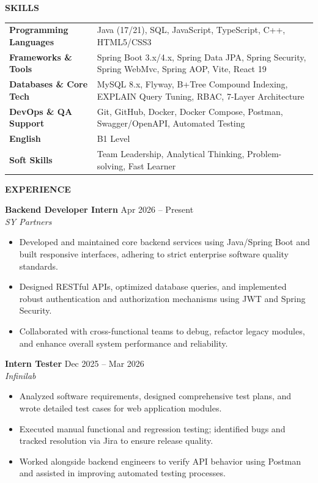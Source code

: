 ﻿\documentclass[11pt,a4paper]{article}
\newcommand{\cvsection}[1]{%
  \vspace{7pt}%
  \noindent\textbf{\large #1}\par%
  \vspace{3pt}%
}
\begin{document}
\cvsection{SKILLS}
\noindent
\begin{tabular*}{\textwidth}{@{}p{} p{}@{}}
\hline
\textbf{Programming Languages} & Java (17/21), SQL, JavaScript, TypeScript, C++, HTML5/CSS3 \\
\textbf{Frameworks \& Tools} & Spring Boot 3.x/4.x, Spring Data JPA, Spring Security, Spring WebMvc, Spring AOP, Vite, React 19 \\
\textbf{Databases \& Core Tech} & MySQL 8.x, Flyway, B+Tree Compound Indexing, EXPLAIN Query Tuning, RBAC, 7-Layer Architecture \\
\textbf{DevOps \& QA Support} & Git, GitHub, Docker, Docker Compose, Postman, Swagger/OpenAPI, Automated Testing \\
\textbf{English} & B1 Level \\
\textbf{Soft Skills} & Team Leadership, Analytical Thinking, Problem-solving, Fast Learner \\
\end{tabular*}

\cvsection{EXPERIENCE}

\noindent
\textbf{Backend Developer Intern} \hfill Apr 2026 -- Present \\
\textit{SY Partners}
\begin{itemize}[leftmargin=1.5em, itemsep=2pt, topsep=2pt]
    \item Developed and maintained core backend services using Java/Spring Boot and built responsive interfaces, adhering to strict enterprise software quality standards.
    \item Designed RESTful APIs, optimized database queries, and implemented robust authentication and authorization mechanisms using JWT and Spring Security.
    \item Collaborated with cross-functional teams to debug, refactor legacy modules, and enhance overall system performance and reliability.
\end{itemize}

\vspace{4pt}

\noindent
\textbf{Intern Tester} \hfill Dec 2025 -- Mar 2026 \\
\textit{Infinilab}
\begin{itemize}[leftmargin=1.5em, itemsep=2pt, topsep=2pt]
    \item Analyzed software requirements, designed comprehensive test plans, and wrote detailed test cases for web application modules.
    \item Executed manual functional and regression testing; identified bugs and tracked resolution via Jira to ensure release quality.
    \item Worked alongside backend engineers to verify API behavior using Postman and assisted in improving automated testing processes.
\end{itemize}
\end{document}
